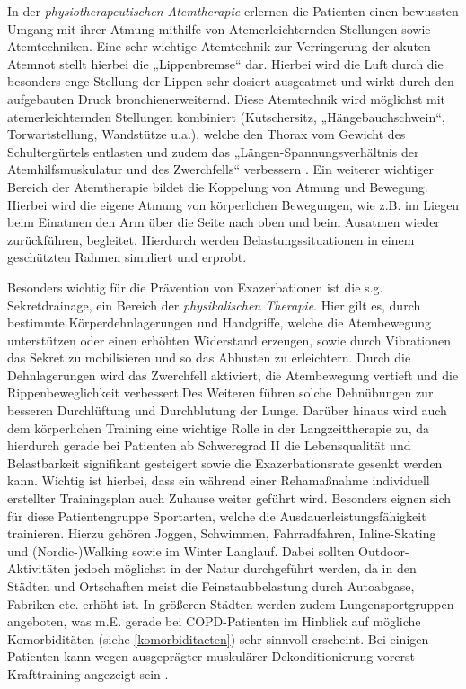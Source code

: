 In der \emph{physiotherapeutischen Atemtherapie} erlernen die Patienten einen bewussten Umgang mit ihrer Atmung mithilfe von Atemerleichternden Stellungen sowie Atemtechniken. Eine sehr wichtige Atemtechnik zur Verringerung der akuten Atemnot stellt hierbei die „Lippenbremse“ dar. Hierbei wird die Luft durch die besonders enge Stellung der Lippen sehr dosiert ausgeatmet und wirkt durch den aufgebauten Druck bronchienerweiternd. Diese Atemtechnik wird möglichst mit atemerleichternden Stellungen kombiniert (Kutschersitz, „Hängebauchschwein“, Torwartstellung, Wandstütze u.a.), welche den Thorax vom Gewicht des Schultergürtels entlasten und zudem das „Längen-Spannungsverhältnis der Atemhilfsmuskulatur und des Zwerchfells“ verbessern \autocite[vgl.][291]{lang2007}. Ein weiterer wichtiger Bereich der Atemtherapie bildet die Koppelung von Atmung und Bewegung. Hierbei wird die eigene Atmung von körperlichen Bewegungen, wie z.B. im Liegen beim Einatmen den Arm über die Seite nach oben und beim Ausatmen wieder zurückführen, begleitet. Hierdurch werden Belastungssituationen in einem geschützten Rahmen simuliert und erprobt.

Besonders wichtig für die Prävention von Exazerbationen ist die s.g. Sekretdrainage, ein Bereich der \emph{physikalischen Therapie}. Hier gilt es, durch bestimmte Körperdehnlagerungen und Handgriffe, welche die Atembewegung unterstützen oder einen erhöhten Widerstand erzeugen, sowie durch Vibrationen das Sekret zu mobilisieren und so das Abhusten zu erleichtern. Durch die Dehnlagerungen wird das Zwerchfell aktiviert, die Atembewegung vertieft und die Rippenbeweglichkeit verbessert.Des Weiteren führen solche Dehnübungen zur besseren Durchlüftung und Durchblutung der Lunge. 
Darüber hinaus wird auch dem körperlichen Training eine wichtige Rolle in der Langzeittherapie zu, da hierdurch gerade bei Patienten ab Schweregrad II die Lebensqualität und Belastbarkeit signifikant gesteigert sowie die Exazerbationsrate gesenkt werden kann. Wichtig ist hierbei, dass ein während einer Rehamaßnahme individuell erstellter Trainingsplan auch Zuhause weiter geführt wird. Besonders eignen sich für diese Patientengruppe Sportarten, welche die Ausdauerleistungsfähigkeit trainieren. Hierzu gehören Joggen, Schwimmen, Fahrradfahren, Inline-Skating und (Nordic-)Walking sowie im Winter Langlauf. Dabei sollten Outdoor-Aktivitäten jedoch möglichst in der Natur durchgeführt werden, da in den Städten und Ortschaften meist die Feinstaubbelastung durch Autoabgase, Fabriken etc. erhöht ist. In größeren Städten werden zudem Lungensportgruppen angeboten, was m.E. gerade bei COPD-Patienten im Hinblick auf mögliche Komorbiditäten (siehe \ref{komorbiditaeten}) sehr sinnvoll erscheint. Bei einigen Patienten kann wegen ausgeprägter muskulärer Dekonditionierung vorerst Krafttraining angezeigt sein \autocite[vgl.][291f]{lang2007}.


